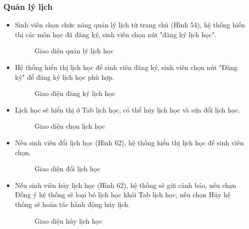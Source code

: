 \subsubsection*{Quản lý lịch}
\begin{itemize}
    \item Sinh viên chọn chức năng quản lý lịch từ trang chủ (Hình 54), hệ thống hiển thị các môn học đã đăng ký, sinh viên chọn nút "đăng ký lịch học". 
    \begin{figure}[H]
    \centering
    \setlength{\fboxsep}{2pt}     
    \setlength{\fboxrule}{0.5pt}   
    \caption{Giao diện quản lý lịch học}
    \end{figure}
    \item Hệ thống hiển thị lịch học để sinh viên đăng ký, sinh viên chọn nút "Đăng ký" để đăng ký lịch học phù hợp.
    \begin{figure}[H]
    \centering
    \setlength{\fboxsep}{2pt}     
    \setlength{\fboxrule}{0.5pt}   
    \caption{Giao diện đăng ký lịch học}
    \end{figure}
    \item Lịch học sẽ hiển thị ở Tab lịch học, có thể hủy lịch học và sửa đổi lịch học.
    \begin{figure}[H]
    \centering
    \setlength{\fboxsep}{2pt}     
    \setlength{\fboxrule}{0.5pt}   
    \caption{Giao diện chọn lịch học}
    \end{figure}
    \item Nếu sinh viên đổi lịch học (Hình 62), hệ thống hiển thị lịch học để sinh viên chọn.
    \begin{figure}[H]
    \centering
    \setlength{\fboxsep}{2pt}     
    \setlength{\fboxrule}{0.5pt}   
    \caption{Giao diện đổi lịch học}
    \end{figure}
    \item Nếu sinh viên hủy lịch học (Hình 62), hệ thống sẽ gửi cảnh báo, nếu chọn Đồng ý hệ thống sẽ loại bỏ lịch học khỏi Tab lịch học, nếu chọn Hủy hệ thống sẽ hoàn tác hành động hủy lịch.
    \begin{figure}[H]
    \centering
    \setlength{\fboxsep}{2pt}     
    \setlength{\fboxrule}{0.5pt}   
    \caption{Giao diện hủy lịch học}
    \end{figure}
\end{itemize}

